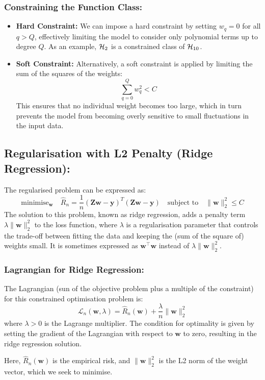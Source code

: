 \subsubsection*{Constraining the Function Class:}
\begin{itemize}
    \item \textbf{Hard Constraint:} We can impose a hard constraint by setting $w_q = 0$ for all $q > Q$, effectively limiting the model to consider only polynomial terms up to degree $Q$. As an example, $\mathcal{H}_2$ is a constrained class of $\mathcal{H}_{10}$.
    \item \textbf{Soft Constraint:} Alternatively, a soft constraint is applied by limiting the sum of the squares of the weights:
    \[
    \sum_{q=0}^Q w_q^2 < C
    \]
    This ensures that no individual weight becomes too large, which in turn prevents the model from becoming overly sensitive to small fluctuations in the input data.
\end{itemize}

\subsection{Regularisation with L2 Penalty (Ridge Regression):}
The regularised problem can be expressed as:
\[
\text{minimise}_{\mathbf{w}} \quad \hat{R}_n = \frac{1}{n} (\mathbf{Zw} - \mathbf{y})^T (\mathbf{Zw} - \mathbf{y}) \quad \text{subject to} \quad \|\mathbf{w}\|_2^2 \leq C
\]
The solution to this problem, known as ridge regression, adds a penalty term $\lambda \|\mathbf{w}\|_2^2$ to the loss function, where $\lambda$ is a regularisation parameter that controls the trade-off between fitting the data and keeping the (sum of the square of) weights small. It is sometimes expressed as $\mathbf{w}^\top \mathbf{w}$ instead of $\lambda \|\mathbf{w}\|_2^2$.

\subsubsection*{Lagrangian for Ridge Regression:}
The Lagrangian (sun of the objective problem plus a multiple of the constraint) for this constrained optimisation problem is:
\[
\mathcal{L}_n(\mathbf{w}, \lambda) = \hat{R}_n(\mathbf{w}) + \frac{\lambda}{n}\|\mathbf{w}\|_2^2
\]
where $\lambda > 0$ is the Lagrange multiplier. The condition for optimality is given by setting the gradient of the Lagrangian with respect to $\mathbf{w}$ to zero, resulting in the ridge regression solution.

Here, \( \hat{R}_n(\mathbf{w}) \) is the empirical risk, and \( \|\mathbf{w}\|_2^2 \) is the L2 norm of the weight vector, which we seek to minimise.

